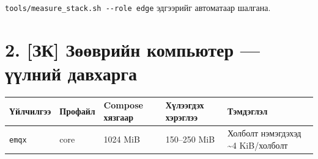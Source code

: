 \texttt{tools/\allowbreak{}measure\_\allowbreak{}stack.\allowbreak{}sh\ -\/\allowbreak{}-role\ edge} эдгээрийг автоматаар шалгана.

\hypertarget{ux437ux43a-ux437ux4e9ux4e9ux432ux440ux438ux439ux43d-ux43aux43eux43cux43fux44cux44eux442ux435ux440-ux4afux4afux43bux43dux438ux439-ux434ux430ux432ux445ux430ux440ux433ux430}{%
\section{2. {[}ЗК{]} Зөөврийн компьютер --- үүлний давхарга}\label{ux437ux43a-ux437ux4e9ux4e9ux432ux440ux438ux439ux43d-ux43aux43eux43cux43fux44cux44eux442ux435ux440-ux4afux4afux43bux43dux438ux439-ux434ux430ux432ux445ux430ux440ux433ux430}}

\begingroup\scriptsize\begin{longtable}[]{@{}lllll@{}}
\toprule
\begin{minipage}[b]{0.17\columnwidth}\raggedright
Үйлчилгээ\strut
\end{minipage} & \begin{minipage}[b]{0.17\columnwidth}\raggedright
Профайл\strut
\end{minipage} & \begin{minipage}[b]{0.17\columnwidth}\raggedright
Compose хязгаар\strut
\end{minipage} & \begin{minipage}[b]{0.17\columnwidth}\raggedright
Хүлээгдэх хэрэглээ\strut
\end{minipage} & \begin{minipage}[b]{0.17\columnwidth}\raggedright
Тэмдэглэл\strut
\end{minipage}\tabularnewline
\midrule
\endhead
\begin{minipage}[t]{0.17\columnwidth}\raggedright
\texttt{emqx}\strut
\end{minipage} & \begin{minipage}[t]{0.17\columnwidth}\raggedright
core\strut
\end{minipage} & \begin{minipage}[t]{0.17\columnwidth}\raggedright
1024 MiB\strut
\end{minipage} & \begin{minipage}[t]{0.17\columnwidth}\raggedright
150--250 MiB\strut
\end{minipage} & \begin{minipage}[t]{0.17\columnwidth}\raggedright
Холболт нэмэгдэхэд \textasciitilde4 KiB/холболт\strut
\end{minipage}\tabularnewline

\end{longtable}
